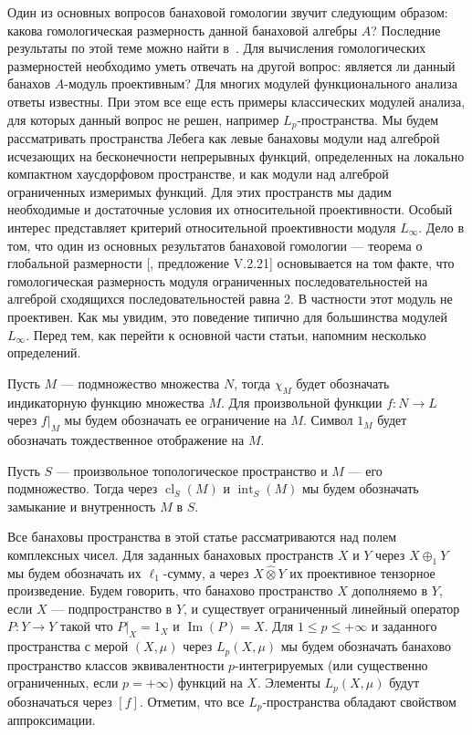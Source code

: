 \documentclass[12pt]{article}
\numberwithin{equation}{subsection}
\theoremstyle{plain}
\newcommand{\projtens}{\mathbin{\widehat{\otimes}}}
\begin{document}
\begin{fulltext}
    Один из основных вопросов банаховой гомологии звучит следующим образом:
    какова гомологическая размерность данной банаховой алгебры $A$? Последние
    результаты по этой теме можно найти в~\cite{SelOnGlobDimBanAlgPowSer}. Для
    вычисления гомологических размерностей необходимо уметь отвечать на другой
    вопрос: является ли данный банахов $A$-модуль проективным? Для многих
    модулей функционального анализа ответы известны. При этом все еще есть
    примеры классических модулей анализа, для которых данный вопрос не решен,
    например $L_p$-пространства. Мы будем рассматривать пространства Лебега как
    левые банаховы модули над алгеброй исчезающих на бесконечности непрерывных
    функций, определенных на локально компактном хаусдорфовом пространстве, и
    как модули над алгеброй ограниченных измеримых функций. Для этих пространств
    мы дадим необходимые и достаточные условия их относительной проективности.
    Особый интерес представляет критерий относительной проективности модуля
    $L_\infty$. Дело в том, что один из основных результатов банаховой гомологии
    --- теорема о глобальной размерности [\cite{HelHomolBanTopAlg}, предложение
    V.2.21] основывается на том факте, что гомологическая размерность модуля
    ограниченных последовательностей на алгеброй сходящихся последовательностей
    равна 2. В частности этот модуль не проективен. Как мы увидим, это поведение
    типично для большинства модулей $L_\infty$. Перед тем, как перейти к
    основной части статьи, напомним несколько определений.

    Пусть $M$ --- подмножество множества $N$, тогда $\chi_M$ будет обозначать
    индикаторную функцию множества $M$. Для произвольной функции $f:N\to L$
    через $f|_M$ мы будем обозначать ее ограничение на $M$. Символ $1_M$ будет
    обозначать тождественное отображение на $M$.

    Пусть $S$ --- произвольное топологическое пространство и $M$ --- его
    подмножество. Тогда через $\operatorname{cl}_S(M)$ и
    $\operatorname{int}_S(M)$ мы будем обозначать замыкание и внутренность $M$ в
    $S$.

    Все банаховы пространства в этой статье рассматриваются над полем
    комплексных чисел. Для заданных банаховых пространств $X$ и $Y$ через
    $X\oplus_1 Y$ мы будем обозначать их $\ell_1$-сумму, а через $X\projtens Y$
    их проективное тензорное произведение. Будем говорить, что банахово
    пространство $X$ дополняемо в $Y$, если $X$ --- подпространство в $Y$, и
    существует ограниченный линейный оператор $P:Y\to Y$ такой что $P|_X=1_X$ и
    $\operatorname{Im}(P)=X$. Для $1\leq p\leq +\infty$ и заданного пространства
    с мерой $(X,\mu)$ через $L_p(X,\mu)$ мы будем обозначать банахово
    пространство классов эквивалентности $p$-интегрируемых (или существенно
    ограниченных, если $p=+\infty$) функций на $X$. Элементы $L_p(X,\mu)$ будут
    обозначаться через $[f]$. Отметим, что все $L_p$-пространства обладают
    свойством аппроксимации.


\end{fulltext}
\end{document}
